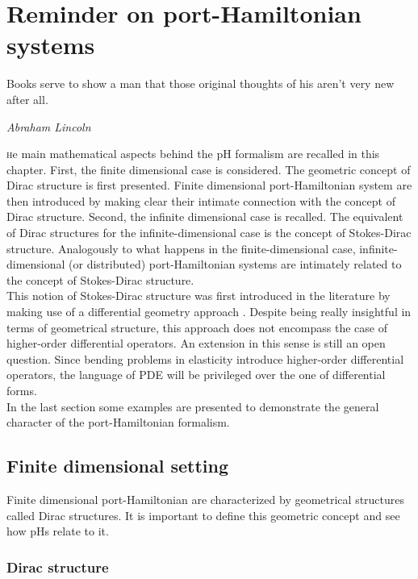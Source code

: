 \chapter{Reminder on port-Hamiltonian systems}

\epigraph{Books serve to show a man that those original thoughts of his aren't very new after all.}{\textit{Abraham Lincoln}}

\minitoc

\lettrine{\color{theme}{T}}he main mathematical aspects behind the pH formalism are recalled in this chapter. First, the finite dimensional case is considered. The geometric concept of Dirac structure \cite{courant1990} is first presented. Finite dimensional port-Hamiltonian system are then introduced by making clear their intimate connection with the concept of Dirac structure. Second, the infinite dimensional case is recalled. The equivalent of Dirac structures for the infinite-dimensional case is the concept of Stokes-Dirac structure. Analogously to what happens in the finite-dimensional case, infinite-dimensional (or distributed) port-Hamiltonian systems are intimately related to the concept of Stokes-Dirac structure. \\

This notion of Stokes-Dirac structure was first introduced in the literature by making use of a differential geometry approach \cite{vanderschaft2002}. Despite being really insightful in terms of geometrical structure, this approach does not encompass the case of higher-order differential operators. An extension in this sense is still an open question. Since bending problems in elasticity introduce higher-order differential operators, the language of PDE will be privileged over the one of differential forms. \\

In the last section some examples are presented to demonstrate the general character of the port-Hamiltonian formalism. 

 
\section{Finite dimensional setting}

Finite dimensional port-Hamiltonian are characterized by geometrical structures called Dirac structures. It is important to define this geometric concept and see how pHs relate to it. \\

\subsection{Dirac structure}

